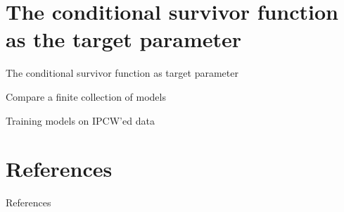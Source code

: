 \documentclass[smaller]{beamer}\usepackage{listings}
\begin{document}
\section{The conditional survivor function as the target parameter}
\label{sec:orgf082892}

\begin{frame}[label={sec:orge91294d}]{The conditional survivor function as target parameter}
\begin{block}{Compare a finite collection of models}
\end{block}

\begin{block}{Training models on IPCW'ed data}
\end{block}
\end{frame}


\section*{References}
\label{sec:orge1067d2}
\begin{frame}[label={sec:org80b7fdd}]{References}
\footnotesize 
\end{frame}
\end{document}
